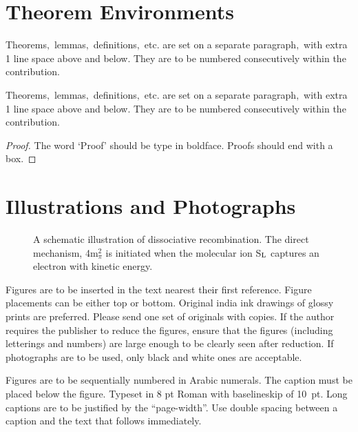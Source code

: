 \documentclass{ws-ijseke}
\begin{document}
\section{Theorem Environments}

\begin{theorem}
Theorems$,$ lemmas$,$ definitions$,$ etc. are set on a separate 
paragraph$,$ with extra 1 line space above and below. They are to 
be numbered consecutively within the contribution.
\end{theorem}

\begin{lemma}
Theorems$,$ lemmas$,$ definitions$,$ etc. are set on a separate 
paragraph$,$ with extra 1 line space above and below. They are to be 
numbered consecutively within the contribution.
\end{lemma}

\begin{proof}
The word `Proof' should be type in boldface. Proofs
should end with\break
a box. 
\end{proof}

\section{Illustrations and Photographs}

\begin{figure}[b]
\centerline{}
\vspace*{8pt}
\caption{A schematic illustration of dissociative recombination. The
direct mechanism, 4m$^2_\pi$ is initiated when the
molecular ion S$_{\rm L}$ captures an electron with kinetic energy.}
\end{figure}

Figures are to be inserted in the text nearest their first
reference.  Figure placements can be either top or bottom.
Original india ink drawings of glossy prints are
preferred. Please send one set of originals with copies. If the
author requires the publisher to reduce the figures, ensure that
the figures (including letterings and numbers) are large enough
to be clearly seen after reduction. If photographs are to be
used, only black and white ones are acceptable.

Figures are to be sequentially numbered in Arabic numerals. The
caption must be placed below the figure. Typeset in 8 pt Roman with
baselineskip of 10~pt. Long captions are to be justified by the
``page-width''.  Use double spacing between a caption and the text
that follows immediately.
\end{document}

